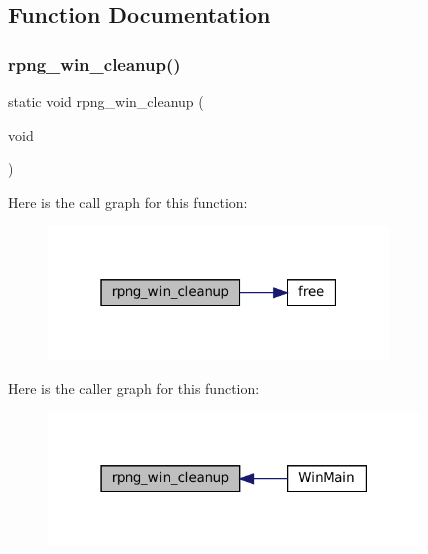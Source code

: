 \subsection{Function Documentation}
\mbox{\label{rpng-win_8c_ae6425ba78c4398b8d03f6c9eeeecbb64}} 
\subsubsection{\texorpdfstring{rpng\+\_\+win\+\_\+cleanup()}{rpng\_win\_cleanup()}}
{\footnotesize\ttfamily static void rpng\+\_\+win\+\_\+cleanup (\begin{DoxyParamCaption}\item[{void}]{ }\end{DoxyParamCaption})\hspace{0.3cm}{\ttfamily [static]}}

Here is the call graph for this function\+:
\nopagebreak
\begin{figure}[H]
\begin{center}
\leavevmode
\includegraphics[width=256pt]{rpng-win_8c_ae6425ba78c4398b8d03f6c9eeeecbb64_cgraph}
\end{center}
\end{figure}
Here is the caller graph for this function\+:
\nopagebreak
\begin{figure}[H]
\begin{center}
\leavevmode
\includegraphics[width=279pt]{rpng-win_8c_ae6425ba78c4398b8d03f6c9eeeecbb64_icgraph}
\end{center}
\end{figure}
\mbox{\label{rpng-win_8c_af3efd367c6a70336925006199ab430e6}} 
